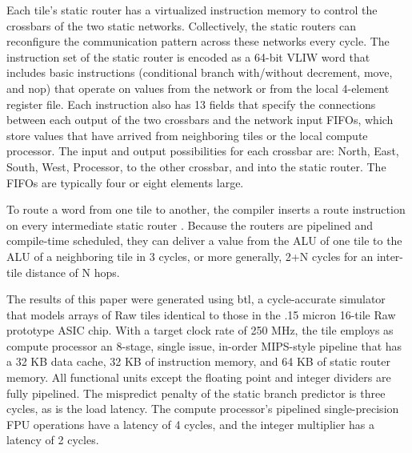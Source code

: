 Each tile's static router has a virtualized instruction memory to
control the crossbars of the two static networks. Collectively, the
static routers can reconfigure the communication pattern across these
networks every cycle.  The instruction set of the static router is
encoded as a 64-bit VLIW word that includes basic instructions
(conditional branch with/without decrement, move, and nop) that
operate on values from the network or from the local 4-element
register file. Each instruction also has 13 fields that specify the
connections between each output of the two crossbars and the network
input FIFOs, which store values that have arrived from neighboring
tiles or the local compute processor.  The input and output
possibilities for each crossbar are: North, East, South, West,
Processor, to the other crossbar, and into the static router. The
FIFOs are typically four or eight elements large.

To route a word from one tile to another, the compiler inserts a route
instruction on every intermediate static router \cite{lee98spacetime}.
Because the routers are pipelined and compile-time scheduled, they can
deliver a value from the ALU of one tile to the ALU of a neighboring
tile in 3 cycles, or more generally, 2+N cycles for an inter-tile
distance of N hops.

The results of this paper were generated using btl, a cycle-accurate
simulator that models arrays of Raw tiles identical to those in the
.15 micron 16-tile Raw prototype ASIC chip.  With a target clock rate
of 250 MHz, the tile employs as compute processor an 8-stage, single
issue, in-order MIPS-style pipeline that has a 32 KB data cache, 32 KB
of instruction memory, and 64 KB of static router memory. All
functional units except the floating point and integer dividers are
fully pipelined. The mispredict penalty of the static branch predictor
is three cycles, as is the load latency. The compute processor's
pipelined single-precision FPU operations have a latency of 4 cycles,
and the integer multiplier has a latency of 2 cycles.